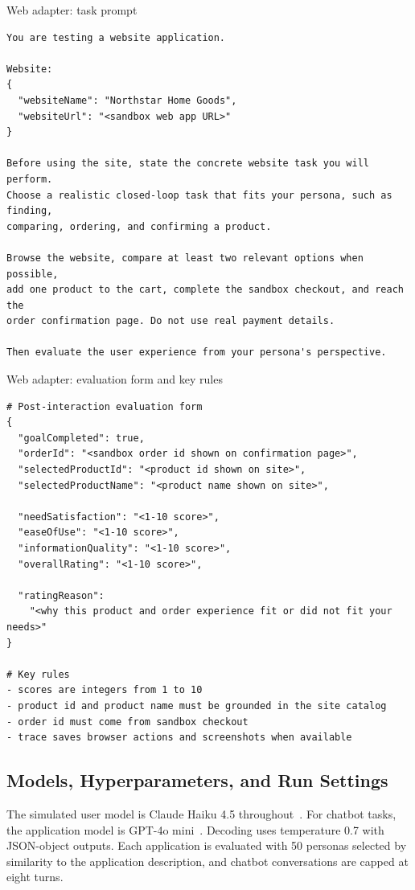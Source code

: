 \begin{promptbox}[label={box:web-task}]{Web adapter: task prompt}
\begin{lstlisting}
You are testing a website application.

Website:
{
  "websiteName": "Northstar Home Goods",
  "websiteUrl": "<sandbox web app URL>"
}

Before using the site, state the concrete website task you will perform.
Choose a realistic closed-loop task that fits your persona, such as finding,
comparing, ordering, and confirming a product.

Browse the website, compare at least two relevant options when possible,
add one product to the cart, complete the sandbox checkout, and reach the
order confirmation page. Do not use real payment details.

Then evaluate the user experience from your persona's perspective.
\end{lstlisting}
\end{promptbox}

\begin{promptbox}[label={box:web-eval}]{Web adapter: evaluation form and key rules}
\begin{lstlisting}
# Post-interaction evaluation form
{
  "goalCompleted": true,
  "orderId": "<sandbox order id shown on confirmation page>",
  "selectedProductId": "<product id shown on site>",
  "selectedProductName": "<product name shown on site>",

  "needSatisfaction": "<1-10 score>",
  "easeOfUse": "<1-10 score>",
  "informationQuality": "<1-10 score>",
  "overallRating": "<1-10 score>",

  "ratingReason":
    "<why this product and order experience fit or did not fit your needs>"
}

# Key rules
- scores are integers from 1 to 10
- product id and product name must be grounded in the site catalog
- order id must come from sandbox checkout
- trace saves browser actions and screenshots when available
\end{lstlisting}
\end{promptbox}


\subsection{Models, Hyperparameters, and Run Settings}
\label{app:settings}

The simulated user model is Claude Haiku 4.5 throughout~\citep{anthropic2025haiku45}. For chatbot tasks, the application model is GPT-4o mini~\citep{openai2024gpt4omini}. Decoding uses temperature 0.7 with JSON-object outputs. Each application is evaluated with 50 personas selected by similarity to the application description, and chatbot conversations are capped at eight turns.


